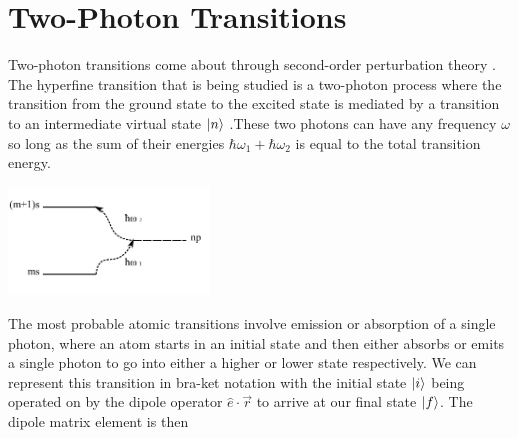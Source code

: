 \section{Two-Photon Transitions}
Two-photon transitions come about through second-order perturbation theory \cite{loudon}. %
The hyperfine transition that is being studied is a two-photon process where the transition from the ground state to the excited state is mediated by a transition to an intermediate virtual state $\ket{n}$ .These two photons can have any frequency $\omega$ so long as the sum of their energies $\hbar \omega_1+\hbar \omega_2$ is equal to the total transition energy.
\begin{center}

        \includegraphics[width=0.4\textwidth]{images/transitioncrop.PNG}

\end{center}
The most probable atomic transitions involve emission or absorption of a single photon, where an atom starts in an initial state and then either absorbs or emits a single photon to go into either a higher or lower state respectively. We can represent this transition in bra-ket notation with the initial state $\ket{i}$ being operated on by the dipole operator \(\hat{e}\cdotp\Vec{r}\) to arrive at our final state $\ket{f}$. The dipole matrix element is then
